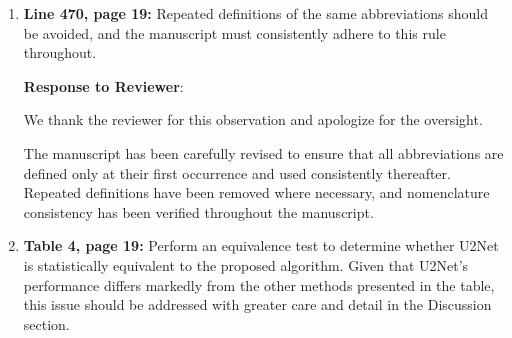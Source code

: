 \documentclass[12pt,letterpaper]{article}
\begin{document}
\begin{enumerate}


     
     
    \item \textbf{Line 470, page 19:} Repeated definitions of the same abbreviations should be avoided, and the manuscript must consistently adhere to this rule throughout.
    

    \textbf{Response to Reviewer}:
        
    We thank the reviewer for this observation and apologize for the oversight.

    The manuscript has been carefully revised to ensure that all abbreviations are defined only at their first occurrence and used consistently thereafter. Repeated definitions have been removed where necessary, and nomenclature consistency has been verified throughout the manuscript.

    
    \item \textbf{Table 4, page 19:} Perform an equivalence test to determine whether U2Net is statistically equivalent to the proposed algorithm. Given that U2Net's performance differs markedly from the other methods presented in the table, this issue should be addressed with greater care and detail in the Discussion section.


        




  

 



\end{enumerate}
\end{document}
